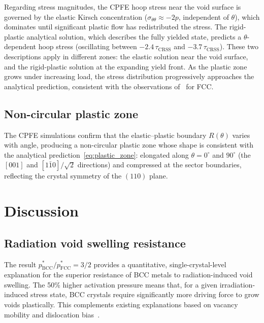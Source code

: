 \documentclass{svjour3} %
\newcommand{\tcrss}{\tau_{\mathrm{CRSS}}}
\newcommand{\stt}{\sigma_{\theta\theta}}
\begin{document}
Regarding stress magnitudes, the CPFE hoop stress near the void
surface is governed by the elastic Kirsch concentration
($\stt \approx -2p$, independent of $\theta$), which dominates until
significant plastic flow has redistributed the stress. The
rigid-plastic analytical solution, which describes the fully yielded
state, predicts a $\theta$-dependent hoop stress (oscillating between
$-2.4\,\tcrss$ and $-3.7\,\tcrss$). These two descriptions apply in
different zones: the elastic solution near the void surface, and the
rigid-plastic solution at the expanding yield front. As the plastic zone
grows under increasing load, the stress distribution progressively
approaches the analytical prediction, consistent with the observations
of~\citet{gan2006} for FCC.

\subsection{Non-circular plastic zone}

The CPFE simulations confirm that the elastic--plastic boundary
$R(\theta)$ varies with angle, producing a non-circular plastic zone
whose shape is consistent with the analytical
prediction~\eqref{eq:plastic_zone}: elongated along
$\theta = 0^\circ$ and $90^\circ$ (the $[001]$ and
$[1\bar{1}0]/\sqrt{2}$ directions) and compressed at the sector
boundaries, reflecting the crystal symmetry of the $(110)$ plane.

\section{Discussion}
\label{sec:discussion}

\subsection{Radiation void swelling resistance}

The result $p^*_{\mathrm{BCC}} / p^*_{\mathrm{FCC}} = 3/2$ provides a
quantitative, single-crystal-level explanation for the superior resistance
of BCC metals to radiation-induced void swelling. The 50\% higher
activation pressure means that, for a given irradiation-induced stress
state, BCC crystals require significantly more driving force to grow voids
plastically. This complements existing explanations based on vacancy
mobility and dislocation bias~\citep{zinkle2013}.
\end{document}
